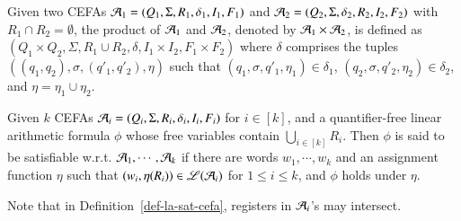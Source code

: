 
Given two CEFAs $\mathcal{A}_1 = ( Q_1, \Sigma, R_1, \delta_1, I_1, F_1)$ and $\mathcal{A}_2 = (Q_2, \Sigma, \delta_2, R_2, I_2, F_2)$ with $R_1 \cap R_2 = \emptyset$,  the product of $\mathcal{A}_1$ and $\mathcal{A}_2$, denoted by $\mathcal{A}_1 \times \mathcal{A}_2$, is defined as $(Q_1 \times Q_2, \Sigma, R_1 \cup R_2, \delta, I_1 \times I_2, F_1 \times F_2)$ where $\delta$ comprises the tuples $((q_1, q_2), \sigma, (q'_1, q'_2), \eta)$ such that $(q_1, \sigma, q'_1, \eta_1) \in \delta_1$, $(q_2, \sigma, q'_2, \eta_2) \in \delta_2$, and $\eta = \eta_1\cup \eta_2$.  %


\begin{definition}\label{def-la-sat-cefa}
	Given $k$ CEFAs $\mathcal{A}_i=(Q_i, \Sigma, R_i, \delta_i, I_i, F_i)$ for $i\in [k]$, %
	and  a quantifier-free linear arithmetic formula $\phi$ 
	whose free variables contain $\bigcup_{i\in [k]} R_i$. Then $\phi$ is said to be satisfiable w.r.t. $\mathcal{A}_1, \cdots, \mathcal{A}_k$ if  there are words $w_1, \cdots, w_k$ and an assignment function $\eta$ %
	such that  $(w_i, \eta(R_i)) \in \mathscr{L}(\mathcal{A}_i)$ for $1\leq i\leq k$, and $\phi$ holds under $\eta$.
\end{definition}
Note that in Definition~\ref{def-la-sat-cefa}, registers in $\mathcal{A}_i$'s may intersect. %

